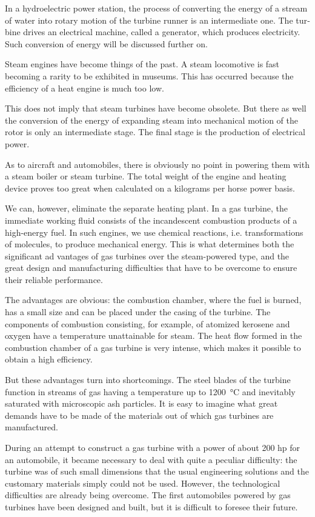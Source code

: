 In a hydroelectric power station, the process of converting the energy of a stream of water into rotary motion of the turbine runner is an intermediate one. The tur­bine drives an electrical machine, called a generator, which produces electricity. Such conversion of energy will be discussed further on.

Steam engines have become things of the past. A steam locomotive is fast becoming a rarity to be exhibited in museums. This has occurred because the efficiency of a heat engine is much too low.

This does not imply that steam turbines have become obsolete. But there as well the conversion of the energy of expanding steam into mechanical motion of the rotor is only an intermediate stage. The final stage is the production of electrical power.

As to aircraft and automobiles, there is obviously no point in powering them with a steam boiler or steam tur­bine. The total weight of the engine and heating device proves too great when calculated on a kilograms per horse power basis.

We can, however, eliminate the separate heating plant. In a gas turbine, the immediate working fluid consists of the incandescent combustion products of a high-ener­gy fuel. In such engines, we use chemical reactions, i.e. transformations of molecules, to produce mechanical energy. This is what determines both the significant ad­ vantages of gas turbines over the steam-powered type, and the great design and manufacturing difficulties that have to be overcome to ensure their reliable perfor­mance.

The advantages are obvious: the combustion chamber, where the fuel is burned, has a small size and can be placed under the casing of the turbine. The components of combustion consisting, for example, of atomized kero­sene and oxygen have a temperature unattainable for steam. The heat flow formed in the combustion chamber of a gas turbine is very intense, which makes it possible to obtain a high efficiency.

But these advantages turn into shortcomings. The steel blades of the turbine function in streams of gas having a temperature up to \SI{1200}{\celsius} and inevitably saturated with microscopic ash particles. It is easy to imagine what great demands have to be made of the materials out of which gas turbines are manufactured.

During an attempt to construct a gas turbine with a power of about 200 hp for an automobile, it became nec­essary to deal with quite a peculiar difficulty: the tur­bine was of such small dimensions that the usual engineering solutions and the customary materials simply could not be used. However, the technological difficul­ties are already being overcome. The first automobiles powered by gas turbines have been designed and built, but it is difficult to foresee their future.

